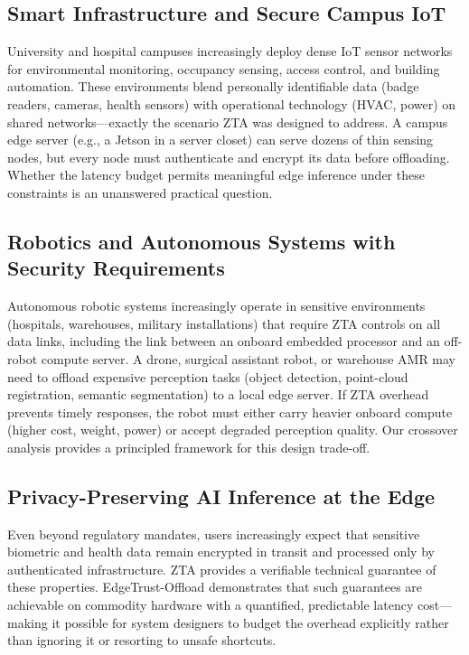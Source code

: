 \documentclass[10pt,twocolumn]{article}
\begin{document}
\subsection{Smart Infrastructure and Secure Campus IoT}

University and hospital campuses increasingly deploy dense IoT sensor networks
for environmental monitoring, occupancy sensing, access control, and
building automation.  These environments blend personally identifiable data
(badge readers, cameras, health sensors) with operational technology (HVAC,
power) on shared networks—exactly the scenario ZTA was designed to address.
A campus edge server (e.g., a Jetson in a server closet) can serve dozens of
thin sensing nodes, but every node must authenticate and encrypt its
data before offloading.  Whether the latency budget permits meaningful
edge inference under these constraints is an unanswered practical question.

\subsection{Robotics and Autonomous Systems with Security Requirements}

Autonomous robotic systems increasingly operate in sensitive environments
(hospitals, warehouses, military installations) that require ZTA controls
on all data links, including the link between an onboard embedded processor
and an off-robot compute server.  A drone, surgical assistant robot, or
warehouse AMR may need to offload expensive perception tasks (object
detection, point-cloud registration, semantic segmentation) to a local edge
server.  If ZTA overhead prevents timely responses, the robot must
either carry heavier onboard compute (higher cost, weight, power) or accept
degraded perception quality.  Our crossover analysis provides a principled
framework for this design trade-off.

\subsection{Privacy-Preserving AI Inference at the Edge}

Even beyond regulatory mandates, users increasingly expect that sensitive
biometric and health data remain encrypted in transit and processed only by
authenticated infrastructure.  ZTA provides a verifiable technical
guarantee of these properties.  EdgeTrust-Offload demonstrates that such
guarantees are achievable on commodity hardware with a quantified, predictable
latency cost—making it possible for system designers to budget the overhead
explicitly rather than ignoring it or resorting to unsafe shortcuts.
\end{document}
